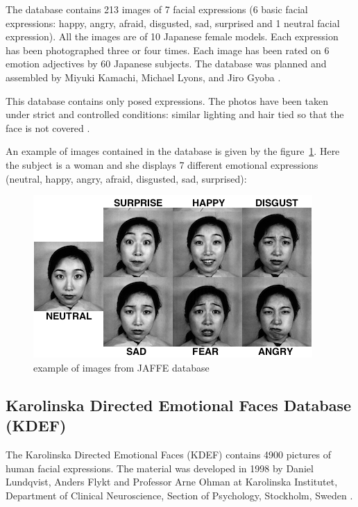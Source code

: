 \vspace{\baselineskip}
\noindent The database contains 213 images of 7 facial expressions (6 basic facial expressions: happy, angry, afraid, disgusted, sad, surprised and 1 neutral facial expression). All the images are of 10 Japanese female models. Each expression has been photographed three or four times. Each image has been rated on 6 emotion adjectives by 60 Japanese subjects. The database was planned and assembled by Miyuki Kamachi, Michael Lyons, and Jiro Gyoba \cite{JAFFE}.
\newline

\noindent This database contains only posed expressions. The photos have been taken under strict  and controlled conditions: similar lighting and hair tied so that the face is not covered \cite{BET12}. 
\newline

\noindent An example of images contained in the database is given by the figure~\ref{jaffe_7facialexpressions}. Here the subject is a woman and she displays 7 different emotional expressions (neutral, happy, angry, afraid, disgusted, sad, surprised): 
\newline

\begin{figure}[!h]
\begin{center}
\noindent \includegraphics[scale=0.8]{figures/jaffe_7facialexpressions} 
\newline
\caption{example of images from JAFFE database}
\label{jaffe_7facialexpressions}
\end{center} 
\end{figure}

\subsection{Karolinska Directed Emotional Faces Database (KDEF)}

\vspace{\baselineskip}
\noindent The Karolinska Directed Emotional Faces (KDEF) contains 4900 pictures of human facial expressions. The material was developed in 1998 by Daniel Lundqvist, Anders Flykt and Professor Arne Ohman at Karolinska Institutet, Department of Clinical Neuroscience, Section of Psychology, Stockholm, Sweden \cite{KDEF}.
\newline

